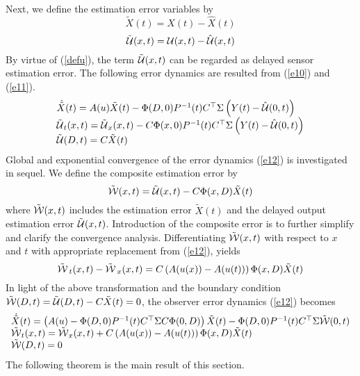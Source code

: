 \documentclass[12pt,draftcls,onecolumn]{IEEEtran}
\begin{document}
Next, we define the estimation error variables by
$$\tilde X(t) = X(t) - \hat X(t)$$
$$\tilde {\cal U}(x,t) = {\cal U}(x,t) - \hat {\cal U}(x,t)$$
By virtue of (\ref{defu}), the term $\tilde {\cal U}(x,t)$ can be regarded as delayed sensor estimation error.
The following error dynamics are resulted from (\ref{e10}) and (\ref{e11}).
\begin{equation}  \label{e12}
 \begin{array}{l}
\dot{\tilde {X}}(t) = A(u)\tilde X(t) - \Phi (D,0){P^{ - 1}}(t){C^{\top} }{\rm{\Sigma }}\left( {Y(t) - \hat {\cal U}(0,t)} \right)\\ {{\tilde {\cal U}}_t}(x,t) = {{\tilde {\cal U}}_x}(x,t) - C\Phi (x,0){P^{ - 1}}(t){C^{\top} }{\rm{\Sigma }}\left( {Y(t) - \hat {\cal U}(0,t)} \right)\\
\tilde {\cal U}(D,t) = C\tilde X(t)
\end{array}
\end{equation}
Global and exponential convergence of the error dynamics (\ref{e12}) is investigated in sequel.
We define the composite estimation error by \cite{c16}
\begin{equation}   \label{error}
\tilde {\cal W}(x,t) = \tilde {\cal U}(x,t) - C\Phi (x,D)\tilde X(t)
\end{equation}
where $\tilde {\cal W}(x,t)$ includes the estimation error $\tilde X(t)$ and the delayed output estimation error $\tilde {\cal U}(x,t)$. Introduction of the composite error is to further simplify and clarify the convergence analysis.
Differentiating $\tilde {\cal W}(x,t)$ with respect to $x$ and $t$ with appropriate replacement from (\ref{e12}), yields
\begin{equation}   \label{e14}
{\tilde {\cal W}_{\;t}}(x,t) - {\tilde {\cal W}_{\;x}}(x,t) = C\left( {A(u(x)) - A(u(t))} \right)\Phi (x,D)\tilde X(t)
\end{equation}
In light of the above transformation and the boundary condition $\tilde {\cal W}(D,t) = \tilde {\cal U}(D,t) - C\tilde X(t) = 0$, the observer error dynamics (\ref{e12}) becomes
\begin{equation}    \label{e15}
 \begin{array}{l}
\dot{\tilde {X}}(t) = \left( {A(u) - \Phi (D,0){P^{ - 1}}(t){C^{\top} }{\rm{\Sigma }}C\Phi (0,D)} \right)\tilde X(t) - \Phi (D,0){P^{ - 1}}(t){C^{\top } }{\rm{\Sigma }}\tilde {\cal W}(0,t)\\
{{\tilde {\cal W}}_t}(x,t) = {{\tilde {\cal W}}_x}(x,t) + C\left( {A(u(x)) - A(u(t))} \right)\Phi (x,D)\tilde X(t)\\
\tilde {\cal W}(D,t) = 0
\end{array}
\end{equation}
The following theorem is the main result of this section.
\end{document}
